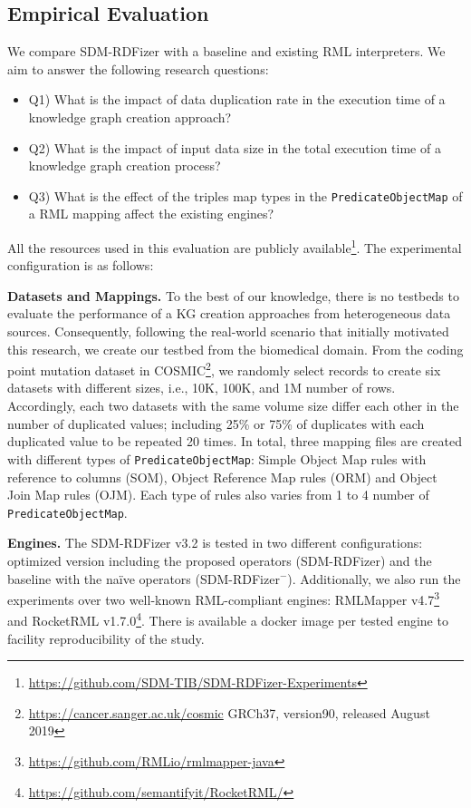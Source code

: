 \subsection{Empirical Evaluation}
\label{sec:eval}
We compare SDM-RDFizer with a baseline and existing RML interpreters. We aim to answer the following research questions:
\begin{itemize}
\item Q1) What is the impact of data duplication rate in the execution time of a knowledge graph creation approach?
\item Q2) What is the impact of input data size in the total execution time of a knowledge graph creation process?
\item Q3) What is the effect of the triples map types in the \verb|PredicateObjectMap| of a RML mapping affect the existing engines?
\end{itemize}
All the resources used in this evaluation are publicly available\footnote{\url{https://github.com/SDM-TIB/SDM-RDFizer-Experiments}}. The experimental configuration is as follows:

\noindent\textbf{Datasets and Mappings.} To the best of our knowledge, there is no testbeds to evaluate the performance of a KG creation approaches from heterogeneous data sources. Consequently, following the real-world scenario that initially motivated this research, we create our testbed from the biomedical domain. From the coding point mutation dataset in COSMIC\footnote{\url{https://cancer.sanger.ac.uk/cosmic} GRCh37, version90, released August 2019}, we randomly select records to create six datasets with different sizes, i.e., 10K, 100K, and 1M number of rows. Accordingly, each two datasets with the same volume size differ each other in the number of duplicated values; including 25\% or 75\% of duplicates with each duplicated value to be repeated 20 times. In total, three mapping files are created with different types of \verb|PredicateObjectMap|: Simple Object Map rules with reference to columns (SOM), Object Reference Map rules (ORM) and Object Join Map rules (OJM). Each type of rules also varies from 1 to 4 number of \verb|PredicateObjectMap|.

\noindent\textbf{Engines.} The SDM-RDFizer v3.2 is tested in two different configurations: optimized version including the proposed operators (SDM-RDFizer) and the baseline with the na\"ive operators (SDM-RDFizer$^-$). Additionally, we also run the experiments over two well-known RML-compliant engines: RMLMapper v4.7\footnote{\url{https://github.com/RMLio/rmlmapper-java}} and RocketRML v1.7.0\footnote{\url{https://github.com/semantifyit/RocketRML/}}. There is available a docker image per tested engine to facility reproducibility of the study.

